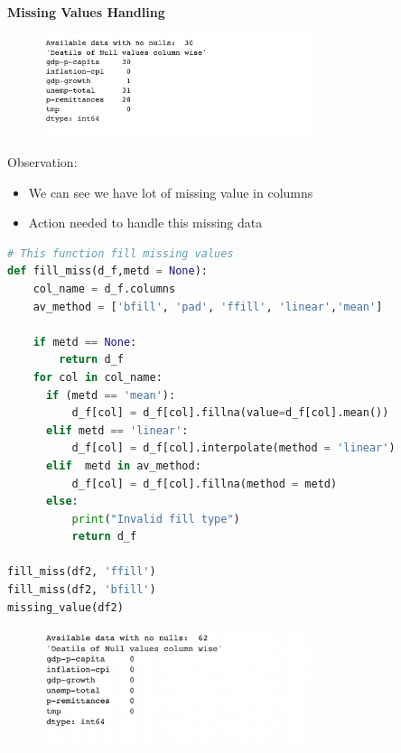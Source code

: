 \vspace{10mm}

\hspace{10mm}\textbf{Missing Values Handling}\\

\begin{figure}[H]
    \centering
    \includegraphics[width=0.7\textwidth]{Images/Missing.png}
\end{figure}

Observation:
\begin{itemize}
    \item We can see we have lot of missing value in columns
\item Action needed to handle this missing data
\end{itemize}

\vspace{30mm}

\begin{lstlisting}[language=Python]
# This function fill missing values
def fill_miss(d_f,metd = None):
    col_name = d_f.columns
    av_method = ['bfill', 'pad', 'ffill', 'linear','mean']

    if metd == None:
        return d_f
    for col in col_name:    
      if (metd == 'mean'):
          d_f[col] = d_f[col].fillna(value=d_f[col].mean()) 
      elif metd == 'linear':
          d_f[col] = d_f[col].interpolate(method = 'linear') 
      elif  metd in av_method:
          d_f[col] = d_f[col].fillna(method = metd)
      else:
          print("Invalid fill type")
          return d_f

fill_miss(df2, 'ffill')
fill_miss(df2, 'bfill')
missing_value(df2) 

\end{lstlisting}

\begin{figure}[H]
    \centering
    \includegraphics[width=0.7\textwidth]{Images/fixed_missing.png}
\end{figure}

